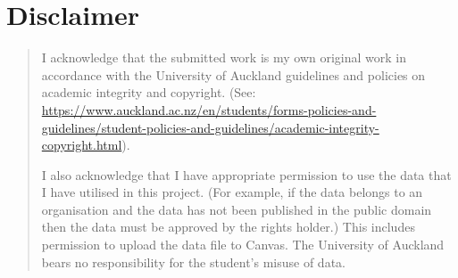 \documentclass[sigplan,screen]{acmart}
\begin{document}
\section*{Disclaimer}
\begin{quote}
I acknowledge that the submitted work is my own original work in accordance with the University of Auckland guidelines and policies on academic integrity and copyright. (See: \url{https://www.auckland.ac.nz/en/students/forms-policies-and-guidelines/student-policies-and-guidelines/academic-integrity-copyright.html}).

I also acknowledge that I have appropriate permission to use the data that I have utilised in this project. (For example, if the data belongs to an organisation and the data has not been published in the public domain then the data must be approved by the rights holder.) This includes permission to upload the data file to Canvas. The University of Auckland bears no responsibility for the student's misuse of data.
\end{quote}
\end{document}
